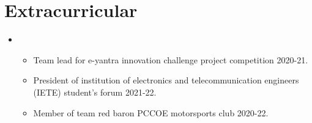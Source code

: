\documentclass[letterpaper,11pt]{article}
\newcommand{\resumeItem}[1]{
  \item\small{
	{#1 \vspace{-2pt}}
  }
}
\newcommand{\resumeItemListStart}{\begin{itemize}}
\newcommand{\resumeItemListEnd}{\end{itemize}\vspace{-5pt}}
\begin{document}
 \vspace{-16pt}


\section{Extracurricular}

\vspace{2pt}

 \begin{itemize}[leftmargin=0.00in, label={}]
 \item
	\resumeItemListStart
 
    	\resumeItem {Team lead for e-yantra innovation challenge project competition 2020-21.}
     
    	\resumeItem {President of institution of electronics and telecommunication engineers (IETE) student's forum 2021-22.}
     
    	\resumeItem {Member of team red baron PCCOE motorsports club 2020-22.}
     
  	\resumeItemListEnd
   
 \end{itemize}
 
 \vspace{-16pt}

\end{document}
